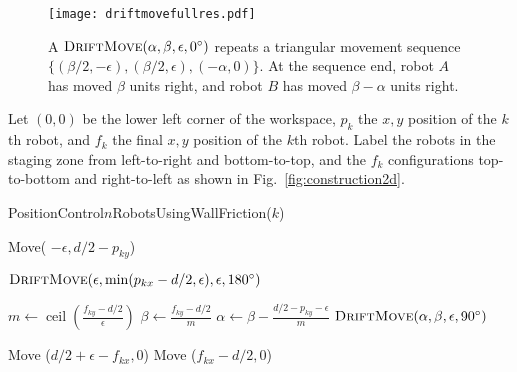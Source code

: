 \begin{figure}
\begin{center}
	\texttt{[image: driftmovefullres.pdf]}
\end{center}
\vspace{-1em}
\caption{\label{fig:driftmove}
A  $\text{\sc DriftMove}(\alpha, \beta, \epsilon,0^\circ)$ repeats a triangular movement sequence $\{ (\beta/2,-\epsilon),(\beta/2,\epsilon),(-\alpha,0)\}$. At the sequence end, robot $A$ has moved $\beta$ units right, and robot $B$ has moved $\beta-\alpha$ units right.}
\vspace{-1em}
\end{figure}

Let $(0,0)$ be the lower left corner of the workspace, $p_k$ the $x,y$ position of the $k$th robot, and $f_k$ the final $x,y$ position of the $k$th robot. Label the robots in the staging zone from left-to-right and bottom-to-top, and the $f_k$ configurations top-to-bottom and right-to-left as shown in Fig.~\ref{fig:construction2d}.

\begin{algorithm}
\caption{PositionControl$n$RobotsUsingWallFriction($k$)}\label{alg:PosControlNRobots}
\begin{algorithmic}[1]
\State Move( $-\epsilon, d/2-p_{ky}$) %


\State $\text{\sc DriftMove}(\epsilon, \min(p_{kx} - d/2,\epsilon), \epsilon,180^\circ)$    %
\EndWhile

\State $m \gets \operatorname{ceil}(\frac{f_{ky}-d/2}{\epsilon})$
\State $\beta \gets \frac{f_{ky}-d/2}{m}$
\State $\alpha \gets \beta - \frac{d/2 - p_{ky}-\epsilon}{m}$
\State $\text{\sc DriftMove}(\alpha, \beta, \epsilon,90^\circ)$    %
\EndFor

\State Move ($d/2+\epsilon-f_{kx}, 0$)  %
\State Move ($f_{kx}-d/2, 0$)  

\end{algorithmic}
\end{algorithm}


